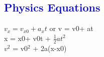 \documentclass[•]{•}, 11pt]{amsart}
\providecommand{\blue}[1]{\textcolor{blue}{ #1}}
\begin{document}
\begin{center}

\section*{\blue{\bf Physics Equations
}}

\end{center}
\noindent
$v_x = v_{x0} + a_x t$
or
v = v\tiny{0}\normalsize + at
\\
x = x\tiny{0}\normalsize + v\tiny{0}\normalsize t + $\tfrac{1}{2} at^2$\\
$v^2$ = v\tiny{0}\normalsize$^2$ + 2a(x-x\tiny{0}\normalsize)
\end{document}
